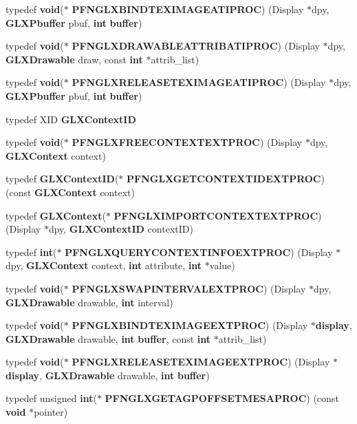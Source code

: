 \begin{DoxyCompactItemize}
\item 
typedef {\bf void}($\ast$ {\bf P\+F\+N\+G\+L\+X\+B\+I\+N\+D\+T\+E\+X\+I\+M\+A\+G\+E\+A\+T\+I\+P\+R\+OC}) (Display $\ast$dpy, {\bf G\+L\+X\+Pbuffer} pbuf, {\bf int} {\bf buffer})
\item 
typedef {\bf void}($\ast$ {\bf P\+F\+N\+G\+L\+X\+D\+R\+A\+W\+A\+B\+L\+E\+A\+T\+T\+R\+I\+B\+A\+T\+I\+P\+R\+OC}) (Display $\ast$dpy, {\bf G\+L\+X\+Drawable} draw, const {\bf int} $\ast$attrib\+\_\+list)
\item 
typedef {\bf void}($\ast$ {\bf P\+F\+N\+G\+L\+X\+R\+E\+L\+E\+A\+S\+E\+T\+E\+X\+I\+M\+A\+G\+E\+A\+T\+I\+P\+R\+OC}) (Display $\ast$dpy, {\bf G\+L\+X\+Pbuffer} pbuf, {\bf int} {\bf buffer})
\item 
typedef X\+ID {\bf G\+L\+X\+Context\+ID}
\item 
typedef {\bf void}($\ast$ {\bf P\+F\+N\+G\+L\+X\+F\+R\+E\+E\+C\+O\+N\+T\+E\+X\+T\+E\+X\+T\+P\+R\+OC}) (Display $\ast$dpy, {\bf G\+L\+X\+Context} context)
\item 
typedef {\bf G\+L\+X\+Context\+ID}($\ast$ {\bf P\+F\+N\+G\+L\+X\+G\+E\+T\+C\+O\+N\+T\+E\+X\+T\+I\+D\+E\+X\+T\+P\+R\+OC}) (const {\bf G\+L\+X\+Context} context)
\item 
typedef {\bf G\+L\+X\+Context}($\ast$ {\bf P\+F\+N\+G\+L\+X\+I\+M\+P\+O\+R\+T\+C\+O\+N\+T\+E\+X\+T\+E\+X\+T\+P\+R\+OC}) (Display $\ast$dpy, {\bf G\+L\+X\+Context\+ID} context\+ID)
\item 
typedef {\bf int}($\ast$ {\bf P\+F\+N\+G\+L\+X\+Q\+U\+E\+R\+Y\+C\+O\+N\+T\+E\+X\+T\+I\+N\+F\+O\+E\+X\+T\+P\+R\+OC}) (Display $\ast$dpy, {\bf G\+L\+X\+Context} context, {\bf int} attribute, {\bf int} $\ast$value)
\item 
typedef {\bf void}($\ast$ {\bf P\+F\+N\+G\+L\+X\+S\+W\+A\+P\+I\+N\+T\+E\+R\+V\+A\+L\+E\+X\+T\+P\+R\+OC}) (Display $\ast$dpy, {\bf G\+L\+X\+Drawable} drawable, {\bf int} interval)
\item 
typedef {\bf void}($\ast$ {\bf P\+F\+N\+G\+L\+X\+B\+I\+N\+D\+T\+E\+X\+I\+M\+A\+G\+E\+E\+X\+T\+P\+R\+OC}) (Display $\ast${\bf display}, {\bf G\+L\+X\+Drawable} drawable, {\bf int} {\bf buffer}, const {\bf int} $\ast$attrib\+\_\+list)
\item 
typedef {\bf void}($\ast$ {\bf P\+F\+N\+G\+L\+X\+R\+E\+L\+E\+A\+S\+E\+T\+E\+X\+I\+M\+A\+G\+E\+E\+X\+T\+P\+R\+OC}) (Display $\ast${\bf display}, {\bf G\+L\+X\+Drawable} drawable, {\bf int} {\bf buffer})
\item 
typedef unsigned {\bf int}($\ast$ {\bf P\+F\+N\+G\+L\+X\+G\+E\+T\+A\+G\+P\+O\+F\+F\+S\+E\+T\+M\+E\+S\+A\+P\+R\+OC}) (const {\bf void} $\ast$pointer)

\end{DoxyCompactItemize}
